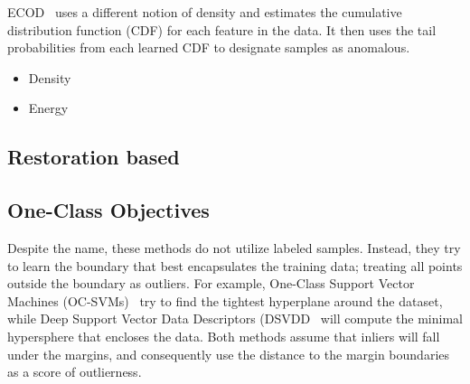 ECOD~\cite{li_ecod_2022} uses a different notion of density and estimates the cumulative distribution function (CDF) for each feature in the data. It then uses the tail probabilities from each learned CDF to designate samples as anomalous.


\begin{itemize}
    \item Density 
    \item Energy
\end{itemize}

\subsection{Restoration based} 

\subsection{One-Class Objectives}

Despite the name, these methods do not utilize labeled samples. Instead, they try to learn the boundary that best encapsulates the training data; treating all points outside the boundary as outliers. For example, One-Class Support Vector Machines (OC-SVMs)~\cite{ocsvm} try to find the tightest hyperplane around the dataset, while Deep Support Vector Data Descriptors (DSVDD~\cite{pmlr-v80-ruff18a}  will compute the minimal hypersphere that encloses the data. Both methods assume that inliers will fall under the margins, and consequently use the distance to the margin boundaries as a score of outlierness. 

